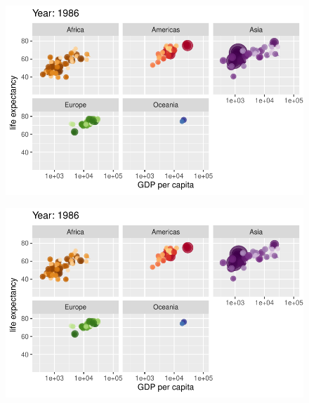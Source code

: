 \documentclass[
  letterpaper,
  DIV=11,
  numbers=noendperiod]{scrartcl}
\begin{document}
\begin{figure}[H]

{\centering \includegraphics{class05_files/figure-pdf/unnamed-chunk-24-62.pdf}

}

\end{figure}

\begin{figure}[H]

{\centering \includegraphics{class05_files/figure-pdf/unnamed-chunk-24-63.pdf}

}

\end{figure}
\end{document}
